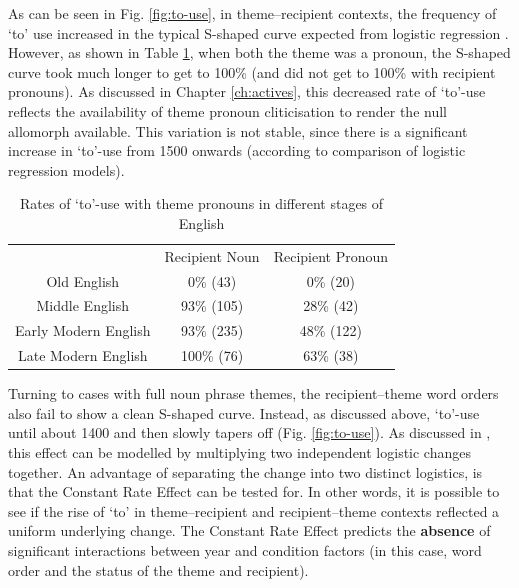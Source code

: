 	As can be seen in Fig. \ref{fig:to-use}, in theme--recipient contexts, the frequency of `to' use increased in the typical S-shaped curve expected from logistic regression \citep{Kroch.1989}. However, as shown in Table \ref{tab:tp-to-rates}, when both the theme was a pronoun, the S-shaped curve took much longer to get to 100\% (and did not get to 100\% with recipient pronouns). As discussed in Chapter \ref{ch:actives}, this decreased rate of `to'-use reflects the availability of theme pronoun cliticisation to render the null allomorph available. This variation is not stable, since there is a significant increase in `to'-use from 1500 onwards (according to comparison of logistic regression models). 

	\begin{table}[ht!]
		\begin{tabular}{ccc}
						& Recipient Noun & Recipient Pronoun\\
			Old English		& 0\% (43) & 0\% (20) \\
			Middle English		& 93\% (105) & 28\% (42) \\
			Early Modern English	& 93\% (235) & 48\% (122) \\
			Late Modern English	& 100\% (76) & 63\% (38) \\
		\end{tabular}
		\caption{Rates of `to'-use with theme pronouns in different stages of English}
		\label{tab:tp-to-rates}
	\end{table}

	Turning to cases with full noun phrase themes, the recipient--theme word orders also fail to show a clean S-shaped curve. Instead, as discussed above, `to'-use until about 1400 and then slowly tapers off (Fig. \ref{fig:to-use}). As discussed in \cite{Bacovcin.2016}, this effect can be modelled by multiplying two independent logistic changes together. An advantage of separating the change into two distinct logistics, is that the Constant Rate Effect can be tested for. In other words, it is possible to see if the rise of `to' in theme--recipient and recipient--theme contexts reflected a uniform underlying change. The Constant Rate Effect predicts the \textbf{absence} of significant interactions between year and condition factors (in this case, word order and the status of the theme and recipient). 

